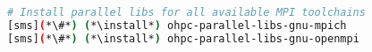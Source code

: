 
\begin{lstlisting}[language=bash,keywords={},upquote=true,keepspaces]
# Install parallel libs for all available MPI toolchains
[sms](*\#*) (*\install*) ohpc-parallel-libs-gnu-mpich
[sms](*\#*) (*\install*) ohpc-parallel-libs-gnu-openmpi
\end{lstlisting}
